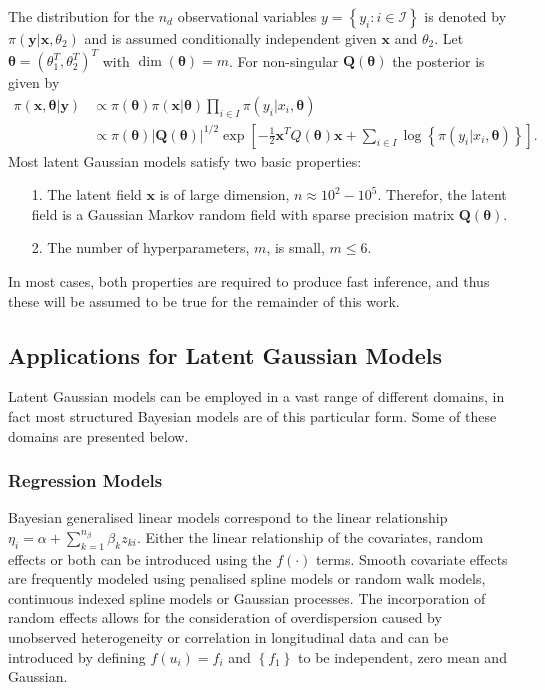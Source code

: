 The distribution for the $n_d$ observational variables $y=\left\lbrace y_i:i\in\mathcal{I}\right\rbrace$ is denoted by $\pi\left(\pmb{y}|\pmb{x}, \theta_2\right)$ and is assumed conditionally independent given $\pmb{x}$ and $\theta_2$. Let $\pmb{\theta}=\left(\theta_1^T,\theta_2^T\right)^T$ with $\dim\left(\pmb{\theta}\right)=m$. For non-singular $\pmb{Q}\left(\pmb{\theta}\right)$ the posterior is given by
\begin{align}
    \pi\left(\pmb{x},\pmb{\theta}|\pmb{y}\right)&\propto\pi\left(\pmb{\theta}\right)\pi\left(\pmb{x}|\pmb{\theta}\right)\prod_{i\in I}\pi\left(y_i|x_i,\pmb{\theta}\right) \nonumber\\
    &\propto \pi\left(\pmb{\theta}\right)\left|\pmb{Q}\left(\pmb{\theta}\right)\right|^{1/2}\exp\left[-\frac{1}{2}\pmb{x}^TQ\left(\pmb{\theta}\right)\pmb{x}+\sum_{i\in I}\log\left\lbrace\pi\left(y_i|x_i,\pmb{\theta}\right)\right\rbrace\right].
\end{align}
Most latent Gaussian models satisfy two basic properties:
\begin{itemize}
    \item[1.] The latent field $\pmb{x}$ is of large dimension, $n\approx10^2-10^5$. Therefor, the latent field is a Gaussian Markov random field with sparse precision matrix $\pmb{Q}\left(\pmb{\theta}\right)$.
    \item[2.] The number of hyperparameters, $m$, is small, $m\leq6$.
\end{itemize}
In most cases, both properties are required to produce fast inference, and thus these will be assumed to be true for the remainder of this work\autocite[Cf.][]{rue2009approximate}.
\subsection{Applications for Latent Gaussian Models}
Latent Gaussian models can be employed in a vast range of different domains, in fact most structured Bayesian models are of this particular form. Some of these domains are presented below.
\subsubsection*{Regression Models}
Bayesian generalised linear models correspond to the linear relationship $\eta_i=\alpha+\sum_{k=1}^{n_\beta}\beta_k z_{ki}.$ Either the linear relationship of the covariates, random effects or both can be introduced using the $f\left(\cdot\right)$ terms. Smooth covariate effects are frequently modeled using penalised spline models or random walk models, continuous indexed spline models or Gaussian processes. The incorporation of random effects allows for the consideration of overdispersion caused by unobserved heterogeneity or correlation in longitudinal data and can be introduced by defining $f\left(u_i\right)=f_i$ and $\left\lbrace f_1\right\rbrace$ to be independent, zero mean and Gaussian.
